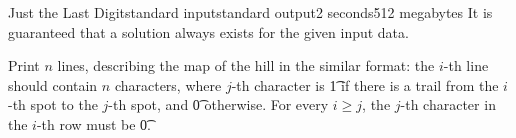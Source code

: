 \begin{problem}{Just the Last Digit}{standard input}{standard output}{2 seconds}{512 megabytes}
It is guaranteed that a solution always exists for the given input data.

\OutputFile
Print $n$ lines, describing the map of the hill in the similar format: the $i$-th line should contain $n$ characters, where $j$-th character is \t{1} if there is a trail from the $i$-th spot to the $j$-th spot, and \t{0} otherwise. For every $i \ge j$, the $j$-th character in the $i$-th row must be \t{0}.

\Example

\begin{example}
%
\end{example}

\end{problem}

